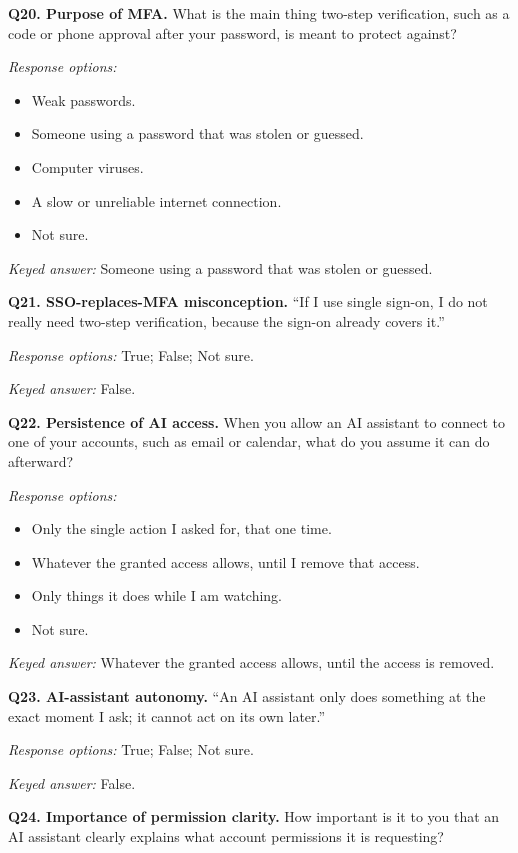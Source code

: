 \documentclass[11pt]{article}
\begin{document}
\textbf{Q20. Purpose of MFA.}
What is the main thing two-step verification, such as a code or phone approval
after your password, is meant to protect against?

\textit{Response options:}
\begin{itemize}[leftmargin=1.6em]
  \item Weak passwords.
  \item Someone using a password that was stolen or guessed.
  \item Computer viruses.
  \item A slow or unreliable internet connection.
  \item Not sure.
\end{itemize}

\textit{Keyed answer:} Someone using a password that was stolen or guessed.

\textbf{Q21. SSO-replaces-MFA misconception.}
``If I use single sign-on, I do not really need two-step verification, because
the sign-on already covers it.''

\textit{Response options:} True; False; Not sure.

\textit{Keyed answer:} False.

\textbf{Q22. Persistence of AI access.}
When you allow an AI assistant to connect to one of your accounts, such as
email or calendar, what do you assume it can do afterward?

\textit{Response options:}
\begin{itemize}[leftmargin=1.6em]
  \item Only the single action I asked for, that one time.
  \item Whatever the granted access allows, until I remove that access.
  \item Only things it does while I am watching.
  \item Not sure.
\end{itemize}

\textit{Keyed answer:} Whatever the granted access allows, until the access is
removed.

\textbf{Q23. AI-assistant autonomy.}
``An AI assistant only does something at the exact moment I ask; it cannot act
on its own later.''

\textit{Response options:} True; False; Not sure.

\textit{Keyed answer:} False.

\textbf{Q24. Importance of permission clarity.}
How important is it to you that an AI assistant clearly explains what account
permissions it is requesting?
\end{document}
